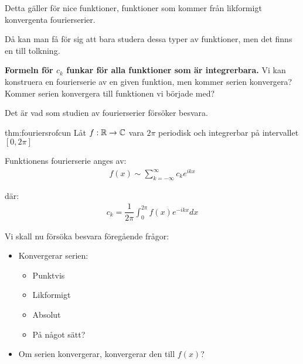 \par\bigskip
\noindent Detta gäller för nice funktioner, funktioner som kommer från likformigt konvergenta fourierserier.
\par\bigskip
\noindent Då kan man få för sig att bara studera dessa typer av funktioner, men det finns en till tolkning.
\par\bigskip
\noindent\textbf{Formeln för $c_k$ funkar för alla funktioner som är integrerbara.} Vi kan konstruera en fourierserie av en given funktion, men kommer serien konvergera? Kommer serien konvergera till funktionen vi började med?\par
\noindent Det är vad som studien av fourierserier försöker besvara. 
\newpage
\begin{theo}{thm:fouriersrofcun}
  Låt $f:\mathbb{R}\to\mathbb{C}$ vara $2\pi$ periodisk och integrerbar på intervallet $[0,2\pi]$
  \par\bigskip
  \noindent Funktionens fourierserie anges av:
  \begin{equation*}
    \begin{gathered}
      f(x)\sim\sum_{k=-\infty}^{\infty}c_ke^{ikx}
    \end{gathered}
  \end{equation*}\par
  \noindent där:
  \begin{equation*}
    \begin{gathered}
      c_k = \dfrac{1}{2\pi}\int_{0}^{2\pi}f(x)e^{-ikx}dx
    \end{gathered}
  \end{equation*}
\end{theo}
\par\bigskip
\noindent Vi skall nu försöka besvara föregående frågor:\par
\begin{itemize}
  \item Konvergerar serien:\par
    \begin{itemize}
      \item Punktvis
      \item Likformigt
      \item Absolut
      \item På något sätt?
    \end{itemize}\par
  \item Om serien konvergerar, konvergerar den till $f(x)$? 
\end{itemize}
\par\bigskip
